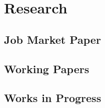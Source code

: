\documentclass[letterpaper,11pt]{article}
\begin{document}
\selectfont




\section{Research}
\vspace{1mm}

\vspace{-1.3mm}

\subsection{Job Market Paper}
\begin{paperlist}
  \item \textbf{\jmpTitle} \jmpAuthors\par
\end{paperlist}

\subsection{Working Papers}
\begin{paperlist}[resume]
  \item \textbf{\synTitle} \synAuthors\par\vspace{0.5ex}
    {\footnotesize\itshape\setlength{\leftskip}{1.25ex}
      \synStatus\par}

  \item \textbf{\levTitle} \levAuthors\par
\end{paperlist}

\subsection{Works in Progress}





\end{document}
